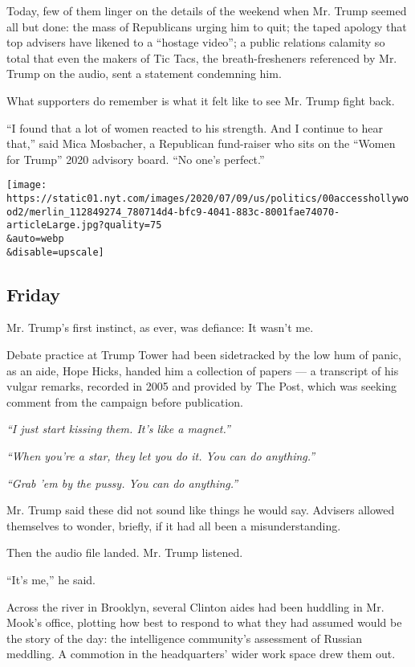 Today, few of them linger on the details of the weekend when Mr. Trump
seemed all but done: the mass of Republicans urging him to quit; the
taped apology that top advisers have likened to a ``hostage video''; a
public relations calamity so total that even the makers of Tic Tacs, the
breath-fresheners referenced by Mr. Trump on the audio, sent a statement
condemning him.

What supporters do remember is what it felt like to see Mr. Trump fight
back.

``I found that a lot of women reacted to his strength. And I continue to
hear that,'' said Mica Mosbacher, a Republican fund-raiser who sits on
the ``Women for Trump'' 2020 advisory board. ``No one's perfect.''

\texttt{[image: https://static01.nyt.com/images/2020/07/09/us/politics/00accesshollywood2/merlin\_112849274\_780714d4-bfc9-4041-883c-8001fae74070-articleLarge.jpg?quality=75\\\&auto=webp\\\&disable=upscale]}

\hypertarget{friday}{%
\subsection{Friday}\label{friday}}

Mr. Trump's first instinct, as ever, was defiance: It wasn't me.

Debate practice at Trump Tower had been sidetracked by the low hum of
panic, as an aide, Hope Hicks, handed him a collection of papers --- a
transcript of his vulgar remarks, recorded in 2005 and provided by The
Post, which was seeking comment from the campaign before publication.

\emph{``I just start kissing them. It's like a magnet.''}

\emph{``When you're a star, they let you do it. You can do anything.''}

\emph{``Grab 'em by the pussy. You can do anything.''}

Mr. Trump said these did not sound like things he would say. Advisers
allowed themselves to wonder, briefly, if it had all been a
misunderstanding.

Then the audio file landed. Mr. Trump listened.

``It's me,'' he said.

Across the river in Brooklyn, several Clinton aides had been huddling in
Mr. Mook's office, plotting how best to respond to what they had assumed
would be the story of the day: the intelligence community's assessment
of Russian meddling. A commotion in the headquarters' wider work space
drew them out.

